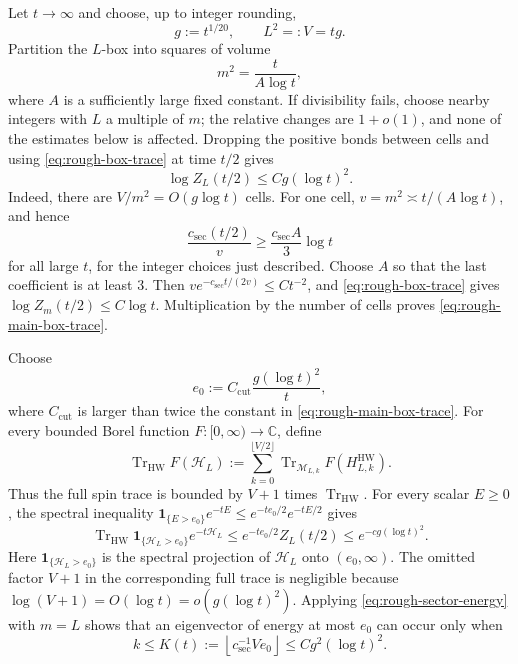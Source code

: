 \documentclass[11pt]{article}
\numberwithin{equation}{section}
\theoremstyle{remark}
\newcommand{\Tr}{\operatorname{Tr}}
\newcommand{\1}{\mathbf 1}
\newcommand{\HW}{\mathrm{HW}}
\begin{document}
Let \(t\to\infty\) and choose, up to integer rounding,
\begin{equation}
 g:=t^{1/20},\qquad L^2=:V=tg.
 \label{eq:thermal-main-box}
\end{equation}
Partition the \(L\)-box into squares of volume
\begin{equation}
 m^2=\frac{t}{A\log t},
 \label{eq:rough-cell-size}
\end{equation}
where \(A\) is a sufficiently large fixed constant.  If divisibility
fails, choose nearby integers with \(L\) a multiple of \(m\); the relative
changes are \(1+o(1)\), and none of the estimates below is affected.
Dropping the positive bonds between cells and using
\eqref{eq:rough-box-trace} at time \(t/2\) gives
\begin{equation}
 \log Z_L(t/2)\leq Cg(\log t)^2.
 \label{eq:rough-main-box-trace}
\end{equation}
Indeed, there are \(V/m^2=O(g\log t)\) cells.  For one cell,
\(v=m^2\asymp t/(A\log t)\), and hence
\[
 \frac{c_{\mathrm{sec}}(t/2)}v
 \geq \frac{c_{\mathrm{sec}}A}{3}\log t
\]
for all large \(t\), for the integer choices just described.  Choose \(A\)
so that the
last coefficient is at least \(3\).  Then
\(ve^{-c_{\mathrm{sec}}t/(2v)}\leq Ct^{-2}\), and
\eqref{eq:rough-box-trace} gives \(\log Z_m(t/2)\leq C\log t\).
Multiplication by the number of cells proves
\eqref{eq:rough-main-box-trace}.

Choose
\begin{equation}
 e_0:=C_{\mathrm{cut}}\frac{g(\log t)^2}{t},
 \label{eq:energy-cutoff}
\end{equation}
where \(C_{\mathrm{cut}}\) is larger than twice the constant in
\eqref{eq:rough-main-box-trace}.  For every bounded Borel function
\(F:[0,\infty)\to\mathbb C\), define
\[
 \Tr_{\HW}F(\mathcal H_L)
 :=\sum_{k=0}^{\lfloor V/2\rfloor}
 \Tr_{\mathcal M_{L,k}}F(H_{L,k}^{\HW}).
\]
Thus the full spin trace is bounded by \(V+1\) times
\(\Tr_{\HW}\).  For every scalar \(E\geq0\), the spectral inequality
\(\1_{\{E>e_0\}}e^{-tE}\leq e^{-te_0/2}e^{-tE/2}\) gives
\begin{equation}
 \Tr_{\HW}\1_{\{\mathcal H_L>e_0\}}e^{-t\mathcal H_L}
 \leq e^{-te_0/2}Z_L(t/2)
 \leq e^{-cg(\log t)^2}.
 \label{eq:high-energy-tail}
\end{equation}
Here \(\1_{\{\mathcal H_L>e_0\}}\) is the spectral projection of
\(\mathcal H_L\) onto \((e_0,\infty)\).
The omitted factor \(V+1\) in the corresponding full trace is negligible
because \(\log(V+1)=O(\log t)=o(g(\log t)^2)\).
Applying \eqref{eq:rough-sector-energy} with \(m=L\) shows that an
eigenvector of energy at most \(e_0\) can occur only when
\begin{equation}
 k\leq K(t):=\left\lfloor c_{\mathrm{sec}}^{-1}Ve_0\right\rfloor
 \leq Cg^2(\log t)^2.
 \label{eq:magnon-number-cutoff}
\end{equation}
\end{document}
